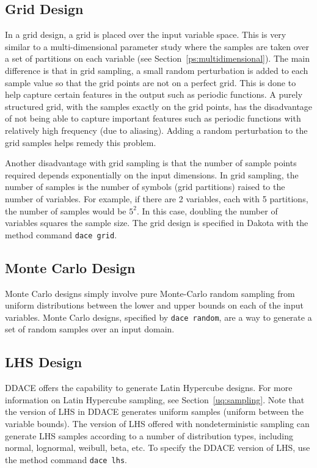\subsection{Grid Design}\label{dace:grid}

In a grid design, a grid is placed over the input variable space. 
This is very similar to a multi-dimensional parameter study where 
the samples are taken over a set of partitions on each variable 
(see Section~\ref{ps:multidimensional}).  The main difference is 
that in grid sampling, a small random perturbation is added 
to each sample value so that the grid points are not on a perfect grid. 
This is done to help capture certain features in the output such as periodic
functions. A purely structured grid, with the samples exactly on the grid 
points, has the disadvantage of not being able to capture important features 
such as periodic functions with relatively high frequency (due to aliasing). 
Adding a random perturbation to the grid samples helps remedy this problem.

Another disadvantage with grid sampling is that the number of sample points 
required depends exponentially on the input dimensions.  In grid sampling, 
the number of samples is the number of symbols (grid partitions) raised 
to the number of variables.  For example, if there are 2 variables, each 
with 5 partitions, the number of samples would be $5^2$.  In this 
case, doubling the number of variables squares the sample size. 
The grid design is specified in 
Dakota with the method command \texttt{dace grid}.

\subsection{Monte Carlo Design}\label{dace:mc}

Monte Carlo designs simply involve pure Monte-Carlo random sampling 
from uniform distributions between the lower and upper bounds on each 
of the input variables.  Monte Carlo designs, specified by 
\texttt{dace random}, are a way to generate a set of random samples 
over an input domain.

\subsection{LHS Design}\label{dace:lhs}

DDACE offers the capability to generate Latin Hypercube designs. 
For more information on Latin Hypercube sampling, see 
Section~\ref{uq:sampling}.  Note that the version of LHS in DDACE 
generates uniform samples (uniform between the variable bounds). 
The version of LHS offered with nondeterministic sampling can generate 
LHS samples according to a number of distribution types, including 
normal, lognormal, weibull, beta, etc. To specify the DDACE version 
of LHS, use the method command \texttt{dace lhs}.

